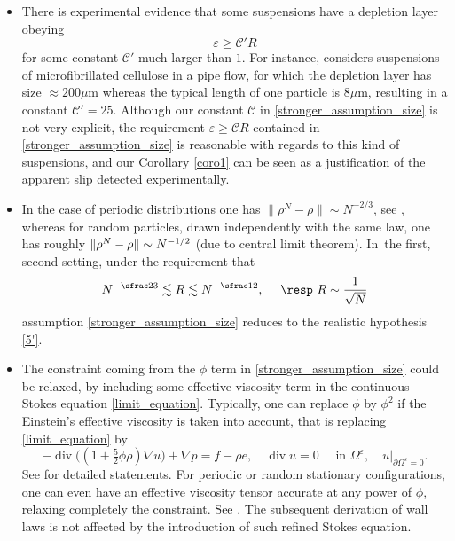 \documentclass[JEP,XML,SOM,Unicode,NoEqCountersInSection,published]{cedram}
\renewcommand{\div}{\operatorname{div}}
\theoremstyle{plain}
\theoremstyle{definition}
\let\pa\partial
\let\na\nabla
\let\eps\varepsilon
\begin{document}
\begin{itemize}
\item There is experimental evidence that some suspensions have a depletion layer obeying
\begin{equation} \label{5'} \tag{5'}
\eps \geq \mathcal{C'} R
\end{equation}
for some constant $\mathcal{C}' $ much larger than $1$. For instance, \cite{Koponen} considers suspensions of microfibrillated cellulose in a pipe flow, for which the depletion layer has size $\approx 200 \mu \mathrm{m}$ whereas the typical length of one particle is $8 \mu \mathrm{m}$, resulting in a constant $\mathcal{C'} = 25$. Although our constant $\mathcal{C}$ in \eqref{stronger_assumption_size} is not very explicit, the requirement $\eps \ge \mathcal{C} R$ contained in \eqref{stronger_assumption_size} is reasonable with regards to this kind of suspensions, and our Corollary \ref{coro1} can be seen as a justification of the apparent slip detected experimentally.
\item In the case of periodic distributions one has $\|\rho^N-\rho\| \sim N^{-2/3}$, see \cite{HillairetHoefer23}, whereas for random particles, drawn independently with the same law, one has roughly $\|\rho^N-\nobreak\rho\| \sim N^{-1/2}$ (due to central limit theorem). In~the first, \resp second setting, under the requirement that
\[
N^{-\sfrac23} \lesssim R \lesssim N^{-\sfrac12}, \quad \text{ \resp } R \sim \frac{1}{\sqrt{N}}
\]
assumption \eqref{stronger_assumption_size} reduces to the realistic hypothesis \eqref{5'}.
\item The constraint coming from the $\phi$ term in \eqref{stronger_assumption_size} could be relaxed, by including some effective viscosity term in the continuous Stokes equation \eqref{limit_equation}. Typically, one can replace $\phi$ by $\phi^2$ if the Einstein's effective viscosity is taken into account, that is replacing \eqref{limit_equation} by
\[
-\div\bigl((1+ \tfrac52 \phi \rho) \na u \bigr) + \na p = f - \rho e, \quad \div u = 0 \quad \text{ in } \Omega^\eps, \quad u\vert_{\pa \Omega^\eps = 0}.
\]
See \cite{Hofer&Schubert} for detailed statements. For periodic or random stationary configurations, one can even have an effective viscosity tensor accurate at any power of $\phi$, relaxing completely the constraint. See \cite{DuerinckxGloria19}. The subsequent derivation of wall laws is not affected by the introduction of such refined Stokes equation.
\end{itemize}
\end{document}
